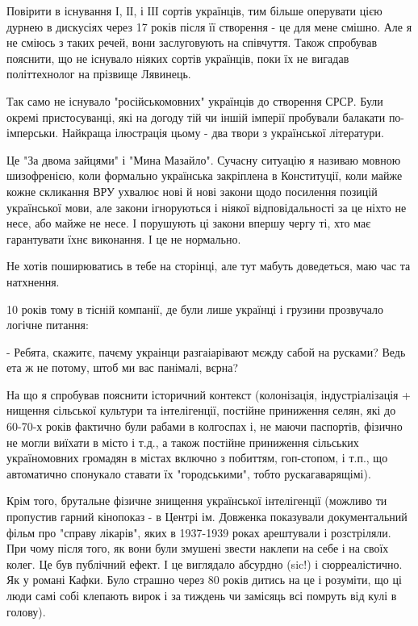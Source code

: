 \begin{itemize}
\begin{itemize}
Повірити в існування І, ІІ, і ІІІ сортів українців, тим більше оперувати цією
дурнею в дискусіях через 17 років після її створення - це для мене смішно. Але
я не сміюсь з таких речей, вони заслуговують на співчуття. Також спробував
пояснити, що не існувало ніяких сортів українців, поки їх не вигадав
політтехнолог на прізвище Лявинець.

Так само не існувало "російськомовних" українців до створення СРСР. Були окремі
пристосуванці, які на догоду тій чи іншій імперії пробували балакати
по-імперськи. Найкраща ілюстрація цьому - два твори з української літератури.

Це "За двома зайцями" і "Мина Мазайло". Сучасну ситуацію я називаю мовною
шизофренією, коли формально українська закріплена в Конституції, коли майже
кожне скликання ВРУ ухвалює нові й нові закони щодо посилення позицій
української мови, але закони ігноруються і ніякої відповідальності за це ніхто
не несе, або майже не несе. І порушують ці закони впершу чергу ті, хто має
гарантувати їхнє виконання. І це не нормально.

Не хотів поширюватись в тебе на сторінці, але тут мабуть доведеться, маю час та натхнення.

10 років тому в тісній компанії, де були лише українці і грузини прозвучало логічне питання:

- Ребята, скажитє, пачєму украінци разгаіарівают мєжду сабой на русками? Ведь ета ж не потому, штоб ми вас панімалі, вєрна?

На що я спробував пояснити історичний контекст (колонізація, індустріалізація +
нищення сільської культури та інтелігенції, постійне приниження селян, які до
60-70-х років фактично були рабами в колгоспах і, не маючи паспортів, фізично
не могли виїхати в місто і т.д., а також постійне приниження сільських
україномовних громадян в містах включно з побиттям, гоп-стопом, і т.п., що
автоматично спонукало ставати їх "городськими", тобто рускагаварящімі). 

Крім того, брутальне фізичне знищення української інтелігенції (можливо ти
пропустив гарний кінопоказ - в Центрі ім. Довженка показували документальний
фільм про "справу лікарів", яких в 1937-1939 роках арештували і розстріляли.
При чому після того, як вони були змушені звести наклепи на себе і на своїх
колег. Це був публічний ефект. І це виглядало абсурдно (sic!) і сюрреалістично.
Як у романі Кафки. Було страшно через 80 років дитись на це і розуміти, що ці
люди самі собі клепають вирок і за тиждень чи замісяць всі помруть від кулі в
голову).


\end{itemize}
\end{itemize}
